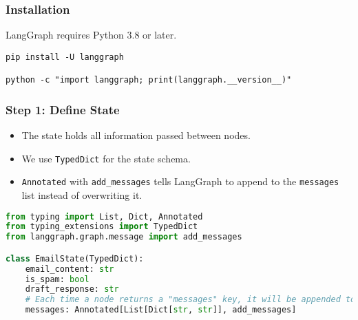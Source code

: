 \begin{frame}[fragile]\frametitle{Installation}
LangGraph requires Python 3.8 or later. 

      \begin{lstlisting}
pip install -U langgraph

python -c "import langgraph; print(langgraph.__version__)"
      \end{lstlisting}
\end{frame}


\begin{frame}[fragile]\frametitle{Step 1: Define State}
      \begin{itemize}
        \item The state holds all information passed between nodes.
        \item We use \texttt{TypedDict} for the state schema.
        \item \texttt{Annotated} with \texttt{add\_messages} tells LangGraph to append to the \texttt{messages} list instead of overwriting it.
      \end{itemize}
\begin{lstlisting}[language=Python, basicstyle=\tiny]
from typing import List, Dict, Annotated
from typing_extensions import TypedDict
from langgraph.graph.message import add_messages

class EmailState(TypedDict):
    email_content: str
    is_spam: bool
    draft_response: str
    # Each time a node returns a "messages" key, it will be appended to this list
    messages: Annotated[List[Dict[str, str]], add_messages]
\end{lstlisting}
\end{frame}


      
